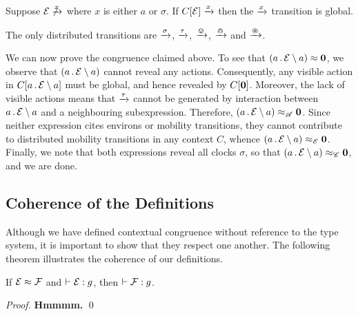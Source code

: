 \documentclass[orivec,envcountsame]{llncs}
\newcommand{\Eq}{\approx}
\newcommand{\EqA}{\mathrel{\Eq_{\mathscr{A}}}}
\newcommand{\EqC}{\mathrel{\Eq_{\mathscr{C}}}}
\newcommand{\EqE}{\mathrel{\Eq_{\mathscr{E}}}}
\newcommand{\Does}[1]{\xderives{#1}}
\newcommand{\Theorem}{\vdash}
\newcommand{\OfType}{\mathrel{:}}
\begin{document}
\begin{proposition}
Suppose $\expr \not\Does{x}$ where $x$ is either $a$ or $\sigma$. If $C[\expr] \Does{x}$ then the $\Does{x}$ transition is global.
\end{proposition}

\begin{proposition}
The only distributed transitions are $\Does{\sigma}$, $\Does{\tau}$, $\Does{\tin}$, $\Does{\tout}$ and $\Does{\topen}$.
\end{proposition}

We can now prove the congruence claimed above. To see that $\left(a\pref\expr \res{a}\right) \Eq \nil$, we observe that $\left(a\,.\,\text{$\mathcal{E}$} \setminus {a}\right)$ cannot reveal any actions. Consequently, any visible action in $C[a\,.\,\text{$\mathcal{E}$} \setminus {a}]$ must be global, and hence revealed by $C[\textbf{0}]$. Moreover, the lack of visible actions means that $\Does{\tau}$ cannot be generated by interaction between $a\,.\,\text{$\mathcal{E}$} \setminus {a}$ and a neighbouring subexpression. Therefore, $\left(a\pref\expr \res{a}\right) \EqA \nil$. Since neither expression cites environs or mobility transitions, they cannot contribute to distributed mobility transitions in any context $C$, whence $\left(a\pref\expr \res{a}\right) \EqE \nil$. Finally, we note that both expressions reveal all clocks $\sigma$, so that $\left(a\pref\expr \res{a}\right) \EqC \nil$, and we are done.


\subsection{Coherence of the Definitions}
Although we have defined contextual congruence without reference to the type system, it is important to show that they respect one another. The following theorem illustrates the coherence of our definitions.

\begin{theorem}
If $\expr \Eq \exprb$ and $\Theorem \expr \OfType g$, then $\Theorem \exprb \OfType g$.
\end{theorem}
\begin{proof}
\textbf{Hmmmm.} 
\qed \end{proof}



\end{document}
